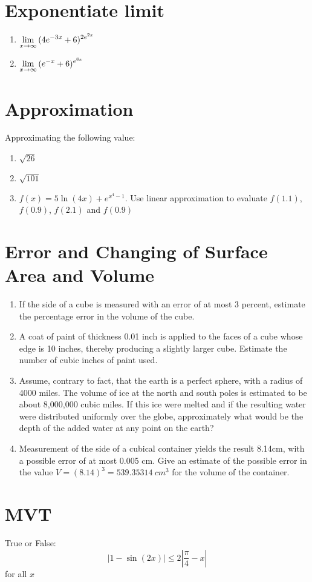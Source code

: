 	\section{Exponentiate limit}
	\begin{enumerate}
		\item $\displaystyle \lim_{x \to \infty}{(4e^{-3x}+6)^{2e^{2x}}}$
		\vskip 5cm
		\item $\displaystyle \lim_{x \to \infty}{(e^{-x}+6)^{e^{8x}}}$
		\vskip 5cm

	\end{enumerate}

	\section{Approximation}
	Approximating the following value:
	\begin{enumerate}
		\item $\sqrt{26}$
		\vskip 4cm
		\item $\sqrt{101}$
		\vskip 4cm 
		\item $f(x)=5\ln(4x)+e^{x^4-1}$. Use linear approximation to evaluate $f(1.1)$, $f(0.9)$, $f(2.1)$ and $f(0.9)$
		\newpage
		
	\end{enumerate}
	\section{Error and Changing of Surface Area and Volume}
	\begin{enumerate}
		\item If the side of a cube is measured with an error of at most 3 percent, estimate the percentage error in the volume of the cube.
		\vskip 5cm
		\item A coat of paint of thickness 0.01 inch is applied to the faces of a cube whose edge is 10 inches, thereby producing a slightly larger cube. Estimate the number of cubic inches of paint used.
		\vskip 5cm 
		\item Assume, contrary to fact, that the earth is a perfect sphere, with a radius of 4000 miles. The volume of ice at the north and south poles is estimated to be about 8,000,000 cubic miles. If this ice were melted and if the resulting water were distributed uniformly over the globe, approximately what would be the depth of the added water at any point on the earth?
		\vskip 5cm 
		\item Measurement of the side of a cubical container yields the result 8.14cm, with a possible error of at most 0.005 cm. Give an estimate of the possible error in the value $V= (8.14)^3 = 539.35314 \ cm^3$ for the volume of the container.
	\end{enumerate}
	\section{MVT}
	True or False:
	$$|1-\sin(2x)|\leq 2|\frac{\pi}{4}-x|$$
	for all $x$
